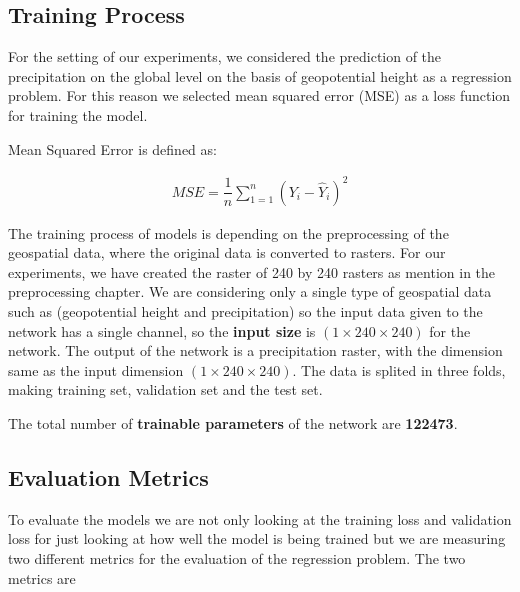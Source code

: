 \newpage

\subsection*{Training Process}

For the setting of our experiments, we considered the prediction of the precipitation on the global level on the basis of geopotential height as a regression problem. For this reason we selected mean squared error (MSE) as a loss function for training the model.

Mean Squared Error is defined as:

\begin{gather*}
    MSE = \dfrac{1}{n}\sum_{1 = 1}^{n}(Y_i-\hat{Y}_i )^2
\end{gather*}

The training process of models is depending on the preprocessing of the geospatial data, where the original data is converted to rasters. For our experiments, we have created the raster of 240 by 240 rasters as mention in the preprocessing chapter.
We are considering only a single type of geospatial data such as (geopotential height and precipitation) so the input data given to the network has a single channel, so the \textbf{input size} is $(1 \times 240  \times 240)$ for the network.
The output of the network is a precipitation raster, with the dimension same as the input dimension $(1 \times 240  \times 240)$. The data is splited in three folds, making training set, validation set and the test set.

The total number of \textbf{trainable parameters} of the network are \textbf{122473}.
\subsection*{Evaluation Metrics}

To evaluate the models we are not only looking at the training loss and validation loss for just looking at how well the model is being trained but we are measuring two different metrics for the evaluation of the regression problem.
The two metrics are

